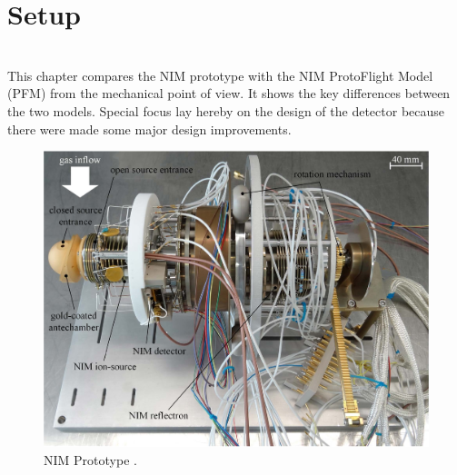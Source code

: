 \section{Setup}\label{sec:setup} %
	\textbf{}\\
	This chapter compares the NIM prototype with the NIM ProtoFlight Model (PFM) from the mechanical point of view. It shows the key differences between the two models. Special focus lay hereby on the design of the detector because there were made some major design improvements.\\
	\begin{figure}[h] %
		\centering
		\includegraphics[width=\textwidth]{Setup/Prototype_totPic.jpg}
		\caption{NIM Prototype \cite{Diss_Meyer}.}
		\label{fig:SetupProto}
	\end{figure}
